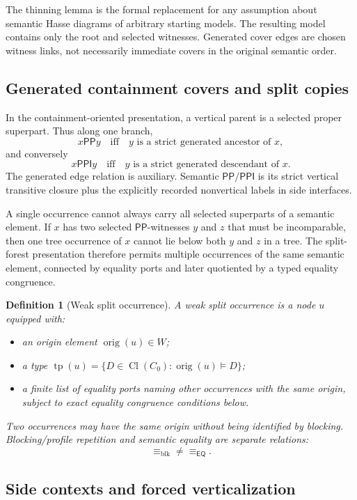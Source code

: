 \documentclass[11pt]{article}
\newtheorem{definition}[theorem]{Definition}
\newcommand{\EQ}{\mathsf{EQ}}
\newcommand{\PP}{\mathsf{PP}}
\newcommand{\PPI}{\mathsf{PPI}}
\newcommand{\Cl}{\operatorname{Cl}}
\newcommand{\tp}{\operatorname{tp}}
\newcommand{\eqE}{\equiv_{\EQ}}
\newcommand{\blkE}{\equiv_{\mathrm{blk}}}
\begin{document}
The thinning lemma is the formal replacement for any assumption about semantic Hasse diagrams of arbitrary starting models.  The resulting model contains only the root and selected witnesses.  Generated cover edges are chosen witness links, not necessarily immediate covers in the original semantic order.

\subsection{Generated containment covers and split copies}

In the containment-oriented presentation, a vertical parent is a selected proper superpart.  Thus along one branch,
\[
  x\PP y
  \quad\text{iff}\quad
  y\text{ is a strict generated ancestor of }x,
\]
and conversely
\[
  x\PPI y
  \quad\text{iff}\quad
  y\text{ is a strict generated descendant of }x.
\]
The generated edge relation is auxiliary.  Semantic $\PP/\PPI$ is its strict vertical transitive closure plus the explicitly recorded nonvertical labels in side interfaces.

A single occurrence cannot always carry all selected superparts of a semantic element.  If $x$ has two selected $\PP$-witnesses $y$ and $z$ that must be incomparable, then one tree occurrence of $x$ cannot lie below both $y$ and $z$ in a tree.  The split-forest presentation therefore permits multiple occurrences of the same semantic element, connected by equality ports and later quotiented by a typed equality congruence.

\begin{definition}[Weak split occurrence]
A weak split occurrence is a node $u$ equipped with:
\begin{itemize}
\item an origin element $\operatorname{orig}(u)\in W$;
\item a type $\tp(u)=\{D\in\Cl(C_0):\operatorname{orig}(u)\models D\}$;
\item a finite list of equality ports naming other occurrences with the same origin, subject to exact equality congruence conditions below.
\end{itemize}
Two occurrences may have the same origin without being identified by blocking.  Blocking/profile repetition and semantic equality are separate relations:
\[
  \blkE\ne\eqE.
\]
\end{definition}

\subsection{Side contexts and forced verticalization}
\end{document}
